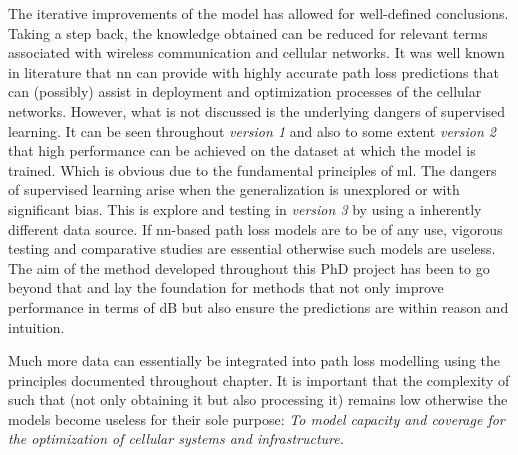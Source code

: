 The iterative improvements of the model has allowed for well-defined conclusions. Taking a step back, the knowledge obtained can be reduced for relevant terms associated with wireless communication and cellular networks. It was well known in literature that \gls{nn} can provide with highly accurate path loss predictions that can (possibly) assist in deployment and optimization processes of the cellular networks. However, what is not discussed is the underlying dangers of supervised learning. It can be seen throughout \emph{version 1} and also to some extent \emph{version 2} that high performance can be achieved on the dataset at which the model is trained. Which is obvious due to the fundamental principles of \gls{ml}. The dangers of supervised learning arise when the generalization is unexplored or with significant bias. This is explore and testing in \emph{version 3} by using a inherently different data source. If \gls{nn}-based path loss models are to be of any use, vigorous testing and comparative studies are essential otherwise such models are useless. The aim of the method developed throughout this PhD project has been to go beyond that and lay the foundation for methods that not only improve performance in terms of dB but also ensure the predictions are within reason and intuition. 

Much more data can essentially be integrated into path loss modelling using the principles documented throughout chapter. It is important that the complexity of such that (not only obtaining it but also processing it) remains low otherwise the models become useless for their sole purpose: \emph{To model capacity and coverage for the optimization of cellular systems and infrastructure.}